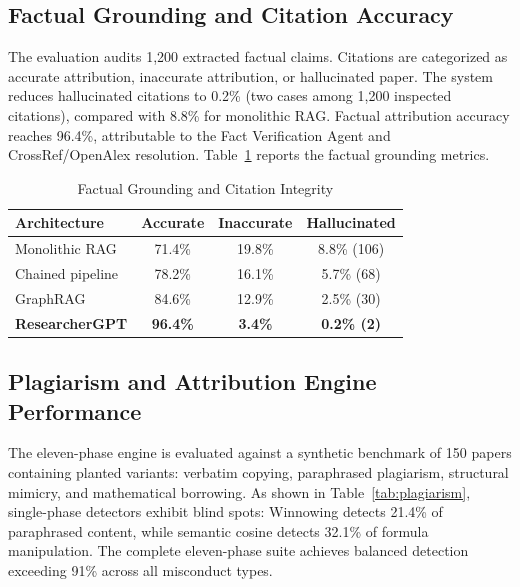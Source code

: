 \documentclass[conference]{IEEEtran}
\begin{document}
\subsection{Factual Grounding and Citation Accuracy}
The evaluation audits 1,200 extracted factual claims. Citations are categorized as accurate attribution, inaccurate attribution, or hallucinated paper. The system reduces hallucinated citations to 0.2\% (two cases among 1,200 inspected citations), compared with 8.8\% for monolithic RAG. Factual attribution accuracy reaches 96.4\%, attributable to the Fact Verification Agent and CrossRef/OpenAlex resolution. Table~\ref{tab:citation} reports the factual grounding metrics.

\begin{table}[!t]
\caption{Factual Grounding and Citation Integrity}
\label{tab:citation}
\centering
\footnotesize
\begin{tabular}{@{}lccc@{}}
\toprule
\textbf{Architecture} & \textbf{Accurate} & \textbf{Inaccurate} & \textbf{Hallucinated} \\
\midrule
Monolithic RAG & 71.4\% & 19.8\% & 8.8\% (106) \\
Chained pipeline & 78.2\% & 16.1\% & 5.7\% (68) \\
GraphRAG & 84.6\% & 12.9\% & 2.5\% (30) \\
\textbf{ResearcherGPT} & \textbf{96.4\%} & \textbf{3.4\%} & \textbf{0.2\% (2)} \\
\bottomrule
\end{tabular}
\end{table}

\subsection{Plagiarism and Attribution Engine Performance}
The eleven-phase engine is evaluated against a synthetic benchmark of 150 papers containing planted variants: verbatim copying, paraphrased plagiarism, structural mimicry, and mathematical borrowing. As shown in Table~\ref{tab:plagiarism}, single-phase detectors exhibit blind spots: Winnowing detects 21.4\% of paraphrased content, while semantic cosine detects 32.1\% of formula manipulation. The complete eleven-phase suite achieves balanced detection exceeding 91\% across all misconduct types.
\end{document}
